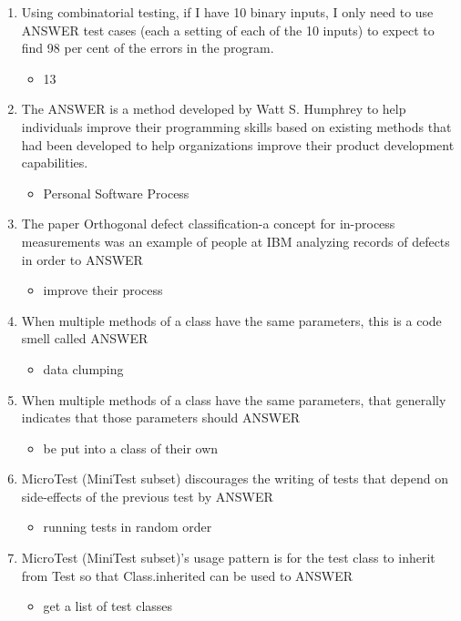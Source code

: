 \documentclass{exam}
\begin{document}
\begin{enumerate}
\item Using combinatorial testing, if I have 10 binary inputs, I only need to use ANSWER test cases (each a setting of each of the 10 inputs) to expect to find 98 per cent of the errors in the program.
\begin{itemize}
\item 13
\end{itemize}
\item The ANSWER is a method developed by Watt S. Humphrey to help individuals improve their programming skills based on existing methods that had been developed to help organizations improve their product development capabilities.
\begin{itemize}
\item Personal Software Process
\end{itemize}
\item The paper Orthogonal defect classification-a concept for in-process measurements was an example of people at IBM analyzing records of defects in order to ANSWER
\begin{itemize}
\item improve their process
\end{itemize}
\item When multiple methods of a class have the same parameters, this is a code smell called ANSWER
\begin{itemize}
\item data clumping
\end{itemize}
\item When multiple methods of a class have the same parameters, that generally indicates that those parameters should ANSWER
\begin{itemize}
\item be put into a class of their own
\end{itemize}
\item MicroTest (MiniTest subset) discourages the writing of tests that depend on side-effects of the previous test by ANSWER
\begin{itemize}
\item running tests in random order
\end{itemize}
\item MicroTest (MiniTest subset)'s usage pattern is for the test class to inherit from Test so that Class.inherited can be used to ANSWER
\begin{itemize}
\item get a list of test classes
\end{itemize}

\end{enumerate}
\end{document}
